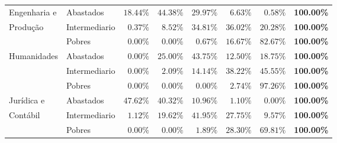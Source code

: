 \begin{table}[h]
\begin{tabular}{ll rrrrrr}
\midrule
Engenharia e	& Abastados               &              $18.44\%$ &        $44.38\%$ &       $29.97\%$ &       $6.63\%$ &             $0.58\%$ & \textbf{100.00\%}\\ 
Produção        & Intermediario           &               $0.37\%$ &         $8.52\%$ &       $34.81\%$ &      $36.02\%$ &            $20.28\%$ & \textbf{100.00\%}\\ 
                & Pobres                  &               $0.00\%$ &         $0.00\%$ &        $0.67\%$ &      $16.67\%$ &            $82.67\%$ & \textbf{100.00\%}\\ 
\midrule
Humanidades   	& Abastados               &               $0.00\%$ &        $25.00\%$ &       $43.75\%$ &      $12.50\%$ &            $18.75\%$ & \textbf{100.00\%}\\ 
                & Intermediario           &               $0.00\%$ &         $2.09\%$ &       $14.14\%$ &      $38.22\%$ &            $45.55\%$ & \textbf{100.00\%}\\ 
                & Pobres                  &               $0.00\%$ &         $0.00\%$ &        $0.00\%$ &       $2.74\%$ &            $97.26\%$ & \textbf{100.00\%}\\ 
\midrule
Jurídica e		& Abastados               &              $47.62\%$ &        $40.32\%$ &       $10.96\%$ &       $1.10\%$ &             $0.00\%$ & \textbf{100.00\%}\\ 
Contábil        & Intermediario           &               $1.12\%$ &        $19.62\%$ &       $41.95\%$ &      $27.75\%$ &             $9.57\%$ & \textbf{100.00\%}\\ 
                & Pobres                  &               $0.00\%$ &         $0.00\%$ &        $1.89\%$ &      $28.30\%$ &            $69.81\%$ & \textbf{100.00\%}\\ 
\bottomrule
\end{tabular}
\end{table}

